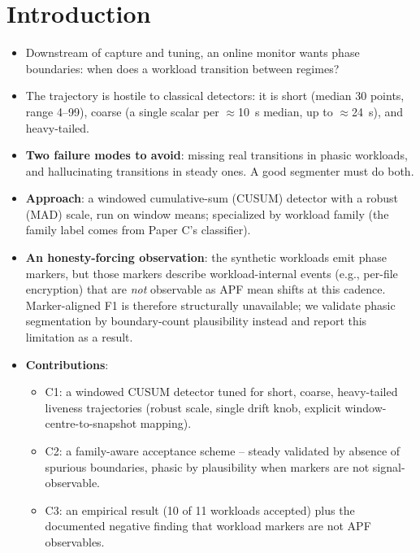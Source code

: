 \documentclass[conference]{IEEEtran}
\begin{document}
\section{Introduction}
\begin{itemize}
  \item Downstream of capture and tuning, an online monitor wants phase
        boundaries: when does a workload transition between regimes?
  \item The trajectory is hostile to classical detectors: it is short (median 30
        points, range 4--99), coarse (a single scalar per
        $\approx$\SI{10}{\second} median, up to $\approx$\SI{24}{\second}), and
        heavy-tailed.
  \item \textbf{Two failure modes to avoid}: missing real transitions in phasic
        workloads, and hallucinating transitions in steady ones. A good
        segmenter must do both.
  \item \textbf{Approach}: a windowed cumulative-sum (CUSUM) detector with a
        robust (MAD) scale, run on window means; specialized by workload family
        (the family label comes from Paper C's classifier).
  \item \textbf{An honesty-forcing observation}: the synthetic workloads emit
        phase markers, but those markers describe workload-internal events
        (e.g., per-file encryption) that are \emph{not} observable as APF mean
        shifts at this cadence. Marker-aligned F1 is therefore structurally
        unavailable; we validate phasic segmentation by boundary-count
        plausibility instead and report this limitation as a result.
  \item \textbf{Contributions}:
    \begin{itemize}
      \item C1: a windowed CUSUM detector tuned for short, coarse, heavy-tailed
            liveness trajectories (robust scale, single drift knob, explicit
            window-centre-to-snapshot mapping).
      \item C2: a family-aware acceptance scheme -- steady validated by absence
            of spurious boundaries, phasic by plausibility when markers are not
            signal-observable.
      \item C3: an empirical result (10 of 11 workloads accepted) plus the
            documented negative finding that workload markers are not APF
            observables.
    \end{itemize}
\end{itemize}
\end{document}
